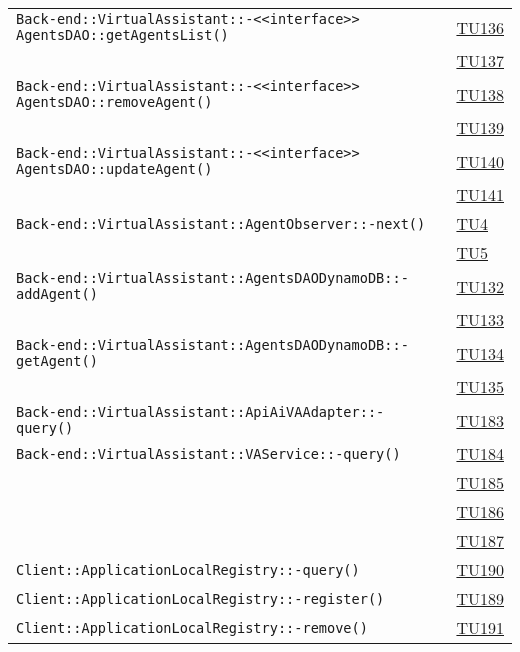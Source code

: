 \begin{longtable}{|>{\centering}m{12cm}|m{1cm}<{\centering}|}
\texttt{Back-end::VirtualAssistant::-\linebreak <<interface>> AgentsDAO::getAgentsList()} & \hyperlink{TU136}{TU136}\\ & \hyperlink{TU137}{TU137}\\ \hline
\texttt{Back-end::VirtualAssistant::-\linebreak <<interface>> AgentsDAO::removeAgent()} & \hyperlink{TU138}{TU138}\\ & \hyperlink{TU139}{TU139}\\ \hline
\texttt{Back-end::VirtualAssistant::-\linebreak <<interface>> AgentsDAO::updateAgent()} & \hyperlink{TU140}{TU140}\\ & \hyperlink{TU141}{TU141}\\ \hline
\texttt{Back-end::VirtualAssistant::AgentObserver::-\linebreak next()} & \hyperlink{TU4}{TU4}\\ & \hyperlink{TU5}{TU5}\\ \hline
\texttt{Back-end::VirtualAssistant::AgentsDAODynamoDB::-\linebreak addAgent()} & \hyperlink{TU132}{TU132}\\ & \hyperlink{TU133}{TU133}\\ \hline
\texttt{Back-end::VirtualAssistant::AgentsDAODynamoDB::-\linebreak getAgent()} & \hyperlink{TU134}{TU134}\\ & \hyperlink{TU135}{TU135}\\ \hline
\texttt{Back-end::VirtualAssistant::ApiAiVAAdapter::-\linebreak query()} & \hyperlink{TU183}{TU183}\\ \hline
\texttt{Back-end::VirtualAssistant::VAService::-\linebreak query()} & \hyperlink{TU184}{TU184}\\ & \hyperlink{TU185}{TU185}\\ & \hyperlink{TU186}{TU186}\\ & \hyperlink{TU187}{TU187}\\ \hline
\texttt{Client::ApplicationLocalRegistry::-\linebreak query()} & \hyperlink{TU190}{TU190}\\ \hline
\texttt{Client::ApplicationLocalRegistry::-\linebreak register()} & \hyperlink{TU189}{TU189}\\ \hline
\texttt{Client::ApplicationLocalRegistry::-\linebreak remove()} & \hyperlink{TU191}{TU191}\\ \hline

\end{longtable}
